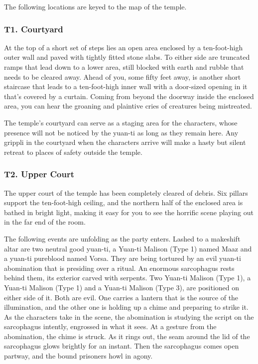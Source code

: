 \documentclass[10pt,a4paper,twoside,bg=print,twocolumn,openany,nodeprecatedcode]{dndbook}
\begin{document}
The following locations are keyed to the map of the temple.

\subsubsection{T1. Courtyard}
\begin{DndReadAloud}{}
At the top of a short set of steps lies an open area enclosed by a ten-foot-high outer wall and paved with tightly fitted stone slabs. To either side are truncated ramps that lead down to a lower area, still blocked with earth and rubble that needs to be cleared away. Ahead of you, some fifty feet away, is another short staircase that leads to a ten-foot-high inner wall with a door-sized opening in it that's covered by a curtain. Coming from beyond the doorway inside the enclosed area, you can hear the groaning and plaintive cries of creatures being mistreated.

\end{DndReadAloud}

The temple's courtyard can serve as a staging area for the characters, whose presence will not be noticed by the yuan-ti as long as they remain here. Any grippli in the courtyard when the characters arrive will make a hasty but silent retreat to places of safety outside the temple.

\subsubsection{T2. Upper Court}
\begin{DndReadAloud}{}
The upper court of the temple has been completely cleared of debris. Six pillars support the ten-foot-high ceiling, and the northern half of the enclosed area is bathed in bright light, making it easy for you to see the horrific scene playing out in the far end of the room.

\end{DndReadAloud}

The following events are unfolding as the party enters. Lashed to a makeshift altar are two neutral good yuan-ti, a Yuan-ti Malison (Type 1) named Maaz and a yuan-ti pureblood named Vorsa. They are being tortured by an evil yuan-ti abomination that is presiding over a ritual. An enormous sarcophagus rests behind them, its exterior carved with serpents. Two Yuan-ti Malison (Type 1), a Yuan-ti Malison (Type 1) and a Yuan-ti Malison (Type 3), are positioned on either side of it. Both are evil. One carries a lantern that is the source of the illumination, and the other one is holding up a chime and preparing to strike it. As the characters take in the scene, the abomination is studying the script on the sarcophagus intently, engrossed in what it sees. At a gesture from the abomination, the chime is struck. As it rings out, the seam around the lid of the sarcophagus glows brightly for an instant. Then the sarcophagus comes open partway, and the bound prisoners howl in agony.
\end{document}
